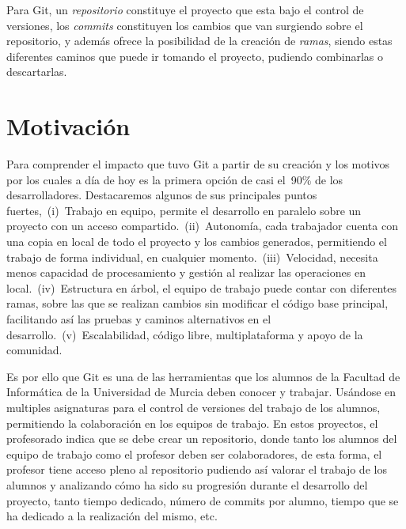 Para Git, un \textit{repositorio} constituye el proyecto que esta bajo el
control de versiones, los \textit{commits} constituyen los cambios que van
surgiendo sobre el repositorio, y además ofrece la posibilidad de la
creación de \textit{ramas}, siendo estas diferentes caminos que puede ir
tomando el proyecto, pudiendo combinarlas o descartarlas.


\section{Motivación\label{01intro_motivacion}}


Para comprender el impacto que tuvo Git a partir de su creación y los
motivos por los cuales a día de hoy es la primera opción de casi el~90\% de
los desarrolladores. Destacaremos algunos de sus principales puntos
fuertes,~(i)~Trabajo en equipo, permite el desarrollo en paralelo sobre un
proyecto con un acceso compartido.~(ii)~Autonomía, cada trabajador cuenta
con una copia en local de todo el proyecto y los cambios generados,
permitiendo el trabajo de forma individual, en cualquier
momento.~(iii)~Velocidad, necesita menos capacidad de procesamiento y
gestión al realizar las operaciones en local.~(iv)~Estructura en árbol, el
equipo de trabajo puede contar con diferentes ramas, sobre las que se
realizan cambios sin modificar el código base principal, facilitando así
las pruebas y caminos alternativos en el desarrollo.~(v)~Escalabilidad,
código libre, multiplataforma y apoyo de la comunidad.

Es por ello que Git es una de las herramientas que los alumnos de la
Facultad de Informática de la Universidad de Murcia deben conocer y
trabajar. Usándose en multiples asignaturas para el control de versiones
del trabajo de los alumnos, permitiendo la colaboración en los equipos de
trabajo. En estos proyectos, el profesorado indica que se debe crear un
repositorio, donde tanto los alumnos del equipo de trabajo como el profesor
deben ser colaboradores, de esta forma, el profesor tiene acceso pleno al
repositorio pudiendo así valorar el trabajo de los alumnos y analizando
cómo ha sido su progresión durante el desarrollo del proyecto, tanto tiempo
dedicado, número de commits por alumno, tiempo que se ha dedicado a la
realización del mismo, etc.

